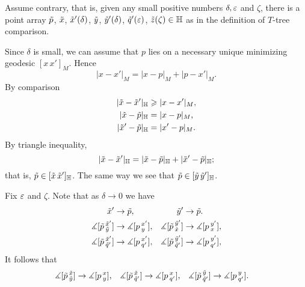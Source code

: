 Assume contrary, that is, given any small positive numbers $\delta,\eps$ and $\zeta$, there is a point array $\~p$, $\~x$, $\~x'(\delta)$, $\~y$, $\~y'(\delta)$, $\~q'(\eps)$, $\~z(\zeta)\in\HH$ as in the definition of $T$-tree comparison.

\begin{wrapfigure}{r}{35 mm}
\end{wrapfigure}

Since $\delta$ is small, we can assume that $p$ lies on a necessary unique minimizing geodesic $[x\,x']_M$.
Hence 
\[|x-x'|_M=|x-p|_M+|p-x'|_M.\]
By comparison
\begin{align*}
|\~x-\~x'|_\HH&\ge|x-x'|_M,
\\
|\~x-\~p|_\HH&=|x-p|_M,
\\
|\~x'-\~p|_\HH&=|x'-p|_M.
\end{align*}
By triangle inequality,
\[|\~x-\~x'|_\HH=|\~x-\~p|_\HH+|\~x'-\~p|_\HH;\]
that is, $\~p\in [\~x\,\~x']_\HH$.
The same way we see that $\~p\in [\~y\,\~y']_\HH$.

Fix $\eps$ and $\zeta$.
Note that as $\delta\to 0$ we have 
\begin{align*}
\~x'&\to \~p,
&
\~y'&\to \~p.
\\
\measuredangle[\~p\,^{\~x'}_{\~y}]&\to \measuredangle[p\,^{x'}_{y}],
&
\measuredangle[\~p\,^{\~y'}_{\~x}]&\to \measuredangle[p\,^{y'}_{x}],
\\
\measuredangle[\~p\,^{\~x'}_{\~q'}]&\to \measuredangle[p\,^{x'}_{q'}],
&
\measuredangle[\~p\,^{\~y'}_{\~q'}]&\to \measuredangle[p\,^{y'}_{q'}],
\end{align*}
It follows that 
\begin{align*}
\measuredangle[\~p\,^{\~x}_{\~y}]&\to \measuredangle[p\,^x_y],
&
\measuredangle[\~p\,^{\~x}_{\~q'}]&\to \measuredangle[p\,^x_{q'}],
&
\measuredangle[\~p\,^{\~y}_{\~q'}]&\to \measuredangle[p\,^y_{q'}].
\end{align*}


